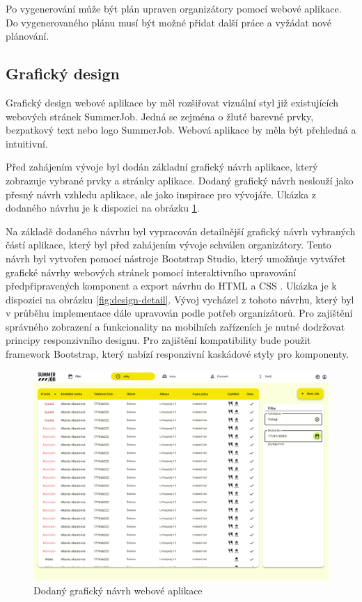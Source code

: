 Po vygenerování může být plán upraven organizátory pomocí webové aplikace. Do vygenerovaného plánu musí být možné přidat další práce a vyžádat nové plánování.

\subsection{Grafický design}

Grafický design webové aplikace by měl rozšiřovat vizuální styl již existujících webových stránek SummerJob. Jedná se zejména o žluté barevné prvky, bezpatkový text nebo
logo SummerJob. Webová aplikace by měla být přehledná a intuitivní.

Před zahájením vývoje byl dodán základní grafický návrh aplikace, který zobrazuje vybrané prvky a stránky aplikace.
Dodaný grafický návrh neslouží jako přesný návrh vzhledu aplikace, ale jako inspirace pro vývojáře. Ukázka z dodaného návrhu je k dispozici na obrázku \ref{fig:design}.

Na základě dodaného návrhu byl vypracován detailnější grafický návrh vybraných částí aplikace, který byl před zahájením vývoje schválen organizátory.
Tento návrh byl vytvořen pomocí nástroje Bootstrap Studio, který umožňuje vytvářet grafické návrhy webových stránek pomocí interaktivního
upravování předpřipravených komponent a export návrhu do HTML a CSS \cite{bootstrap_studio}.
Ukázka je k dispozici na obrázku \ref{fig:design-detail}. Vývoj vycházel z tohoto návrhu, který byl v průběhu implementace dále upravován podle potřeb organizátorů.
Pro zajištění správného zobrazení a funkcionality na mobilních zařízeních je nutné dodržovat principy responzivního designu. Pro zajištění kompatibility bude použit
framework Bootstrap, který nabízí responzivní kaskádové styly pro komponenty.

\begin{figure}[ht]
    \centering
    \includegraphics[width=\textwidth]{chapters/images/graficky-navrh}
    \caption{Dodaný grafický návrh webové aplikace}
    \label{fig:design}
\end{figure}

